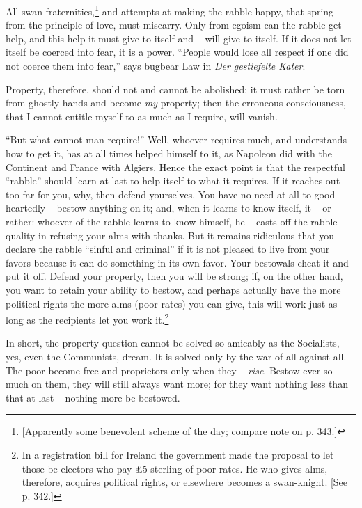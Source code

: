 \documentclass[12pt,a4paper]{book}
\begin{document}
All swan-fraternities,\footnote{[Apparently some benevolent scheme of the day; 
compare note on p. 343.]} and attempts at making the rabble happy, that spring 
from the principle of love, must miscarry. Only from egoism can the rabble get 
help, and this help it must give to itself and -- will give to itself. If it 
does not let itself be coerced into fear, it is a power. ``People would lose 
all respect if one did not coerce them into fear,'' says bugbear Law in 
\textit{Der gestiefelte Kater}.

Property, therefore, should not and cannot be abolished; it must rather be 
torn from ghostly hands and become \textit{my} property; then the erroneous 
consciousness, that I cannot entitle myself to as much as I require, will 
vanish. --

``But what cannot man require!'' Well, whoever requires much, and 
understands how to get it, has at all times helped himself to it, as Napoleon 
did with the Continent and France with Algiers. Hence the exact point is that 
the respectful ``rabble'' should learn at last to help itself to what it 
requires. If it reaches out too far for you, why, then defend yourselves. You 
have no need at all to good-heartedly -- bestow anything on it; and, when it 
learns to know itself, it -- or rather: whoever of the rabble learns to know 
himself, he -- casts off the rabble-quality in refusing your alms with thanks. 
But it remains ridiculous that you declare the rabble ``sinful and 
criminal'' if it is not pleased to live from your favors because it can do 
something in its own favor. Your bestowals cheat it and put it off. Defend 
your property, then you will be strong; if, on the other hand, you want to 
retain your ability to bestow, and perhaps actually have the more political 
rights the more alms (poor-rates) you can give, this will work just as long as 
the recipients let you work it.\footnote{In a registration bill for Ireland 
the government made the proposal to let those be electors who pay \pounds{}5 
sterling of poor-rates. He who gives alms, therefore, acquires political 
rights, or elsewhere becomes a swan-knight. [See p. 342.]}

In short, the property question cannot be solved so amicably as the 
Socialists, yes, even the Communists, dream. It is solved only by the war of 
all against all. The poor become free and proprietors only when they -- 
\textit{rise}. Bestow ever so much on them, they will still always want more; 
for they want nothing less than that at last -- nothing more be bestowed.
\end{document}
